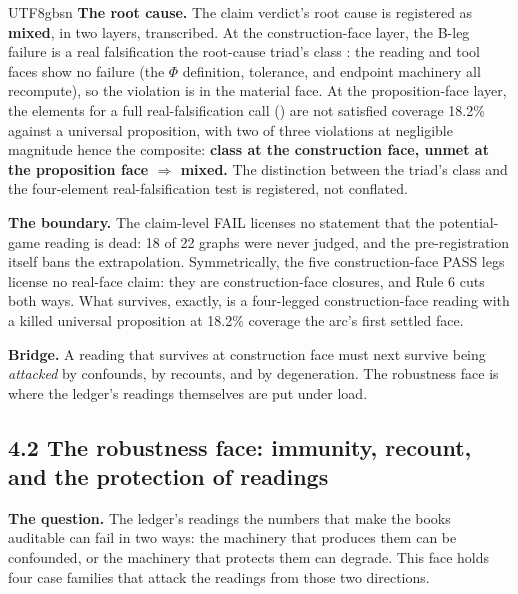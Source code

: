 \documentclass[11pt,letterpaper]{article}
\begin{document}
\begin{CJK}{UTF8}{gbsn}
\textbf{The root cause.} The claim verdict's root cause is registered as \textbf{mixed}, in two layers, transcribed. At the construction-face layer, the B-leg failure is a real falsification \textemdash{} the root-cause triad's class : the reading and tool faces show no failure (the \ensuremath{\Phi} definition, tolerance, and endpoint machinery all recompute), so the violation is in the material face. At the proposition-face layer, the elements for a full real-falsification call () are not satisfied \textemdash{} coverage 18.2\% against a universal proposition, with two of three violations at negligible magnitude \textemdash{} hence the composite: \textbf{class  at the construction face,  unmet at the proposition face \ensuremath{\Rightarrow}  mixed.} The distinction between the triad's class  and the four-element real-falsification test is registered, not conflated.

\textbf{The boundary.} The claim-level FAIL licenses no statement that the potential-game reading is dead: 18 of 22 graphs were never judged, and the pre-registration itself bans the extrapolation. Symmetrically, the five construction-face PASS legs license no real-face claim: they are construction-face closures, and Rule 6 cuts both ways. What survives, exactly, is a four-legged construction-face reading with a killed universal proposition at 18.2\% coverage \textemdash{} the arc's first settled face.

\textbf{Bridge.} A reading that survives at construction face must next survive being \emph{attacked} \textemdash{} by confounds, by recounts, and by degeneration. The robustness face is where the ledger's readings themselves are put under load.

\subsection*{4.2 The robustness face: immunity, recount, and the protection of readings}

\textbf{The question.} The ledger's readings \textemdash{} the numbers that make the books auditable \textemdash{} can fail in two ways: the machinery that produces them can be confounded, or the machinery that protects them can degrade. This face holds four case families that attack the readings from those two directions.


\end{CJK}
\end{document}

